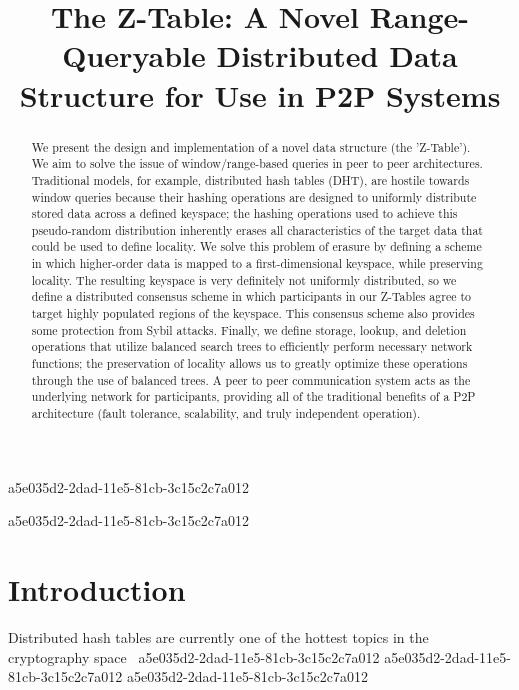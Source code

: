 \documentclass[12pt]{article}
\title{The Z-Table: A Novel Range-Queryable Distributed Data Structure for Use in P2P Systems}
\begin{document}
\maketitle

\begin{abstract}
We present the design and implementation of a novel data structure (the 'Z-Table'). We aim to solve the issue of window/range-based queries in peer to peer architectures. Traditional models, for example,  distributed hash tables (DHT), are hostile towards window queries because their hashing operations are designed to uniformly distribute stored data across a defined keyspace; the hashing operations used to achieve this pseudo-random distribution inherently erases all characteristics of the target data that could be used to define locality. We solve this problem of erasure by defining a scheme in which higher-order data is mapped to a first-dimensional keyspace, while preserving locality. The resulting keyspace is very definitely not uniformly distributed, so we define a distributed consensus scheme in which participants in our Z-Tables agree to target highly populated regions of the keyspace. This consensus scheme also provides some protection from Sybil attacks. Finally, we define storage, lookup, and deletion operations that utilize balanced search trees to efficiently perform necessary network functions; the preservation of locality allows us to greatly optimize these operations through the use of balanced trees. A peer to peer communication system acts as the underlying network for participants, providing all of the traditional benefits of a P2P architecture (fault tolerance, scalability, and truly independent operation).
\end{abstract}
a5e035d2-2dad-11e5-81cb-3c15c2c7a012

\newpage
a5e035d2-2dad-11e5-81cb-3c15c2c7a012\section{Introduction}
Distributed hash tables are currently one of the hottest topics in the cryptography space~\cite{Stoica:2001dj,Rowstron:2001ea,Ratnasamy:2001wn}
a5e035d2-2dad-11e5-81cb-3c15c2c7a012
a5e035d2-2dad-11e5-81cb-3c15c2c7a012\printbibliography
a5e035d2-2dad-11e5-81cb-3c15c2c7a012
\end{document}
